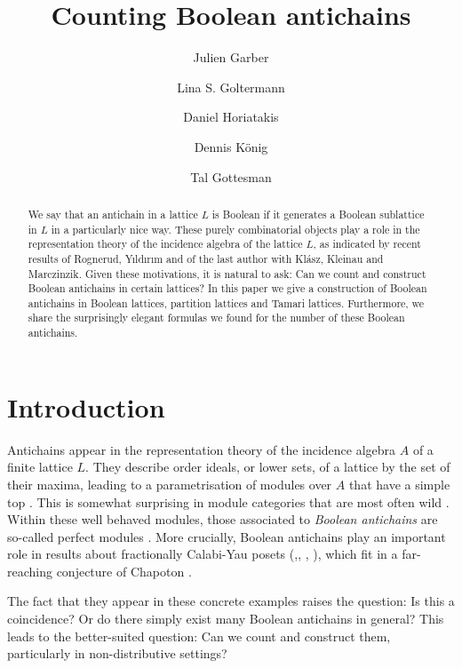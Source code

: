 \documentclass{preprint}
\title[Boolean Antichains]{Counting Boolean antichains}
\author{Julien Garber}
\author{Lina S. Goltermann}
\author{Daniel Horiatakis}
\author{Dennis König}
\author{Tal Gottesman}
\theoremstyle{definition}
\begin{document}
\begin{abstract}
    We say that an antichain in a lattice $L$ is Boolean if it generates a Boolean sublattice in $L$ in a particularly nice way. These purely combinatorial objects play a role in the representation theory of the incidence algebra of the lattice $L$, as indicated by recent results of Rognerud, Yıldırım and of the last author with Klász, Kleinau and Marczinzik. Given these motivations, it is natural to ask: Can we count and construct Boolean antichains in certain lattices? In this paper we give a construction of Boolean antichains in Boolean lattices, partition lattices and Tamari lattices. Furthermore, we share the surprisingly elegant formulas we found for the number of these Boolean antichains.
\end{abstract}

\maketitle
\tableofcontents

\section{Introduction} 
Antichains appear in the representation theory of the incidence algebra $A$ of a finite lattice $L$. They describe order ideals, or lower sets, of a lattice by the set of their maxima, leading to a parametrisation of modules over $A$ that have a simple top \cite[Proposition 2.1]{iyama2022distributive}.
This is somewhat surprising in module categories that are most often wild \cite{loupias1975indecomposable}. Within these well behaved modules, those associated to \emph{Boolean antichains} are so-called perfect modules \cite{GKKM}. More crucially, Boolean antichains play an important role in results about fractionally Calabi-Yau posets (\cite{gottesman2025fractionally},\cite{rognerud2021bounded}, \cite{yildirim2019coxeter}, \cite{kleinau2026cambrian}), which fit in a far-reaching conjecture of Chapoton \cite{chapoton:hal-04037012}. 

The fact that they appear in these concrete examples raises the question: Is this a coincidence? Or do there simply exist many Boolean antichains in general? This leads to the better-suited question: Can we count and construct them, particularly in non-distributive settings?
\end{document}
